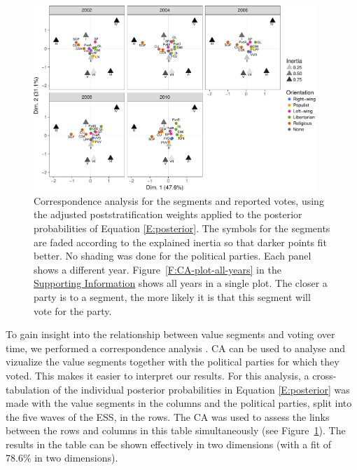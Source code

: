 \documentclass[12pt,letter]{article}\usepackage[]{graphicx}\usepackage[]{xcolor}
\begin{document}
\begin{figure}
\begin{center} 
  \includegraphics[width=0.95\textwidth]{figures/Paper-CA-plots-years-1-edit} 
\end{center}
\caption{Correspondence analysis for the segments and reported votes, using the adjusted poststratification weights applied to the posterior probabilities of Equation \eqref{E:posterior}.  The symbols for the segments are faded according to the explained inertia so that darker points fit better. No shading was done for the political parties. Each panel shows a different year. Figure~\ref{F:CA-plot-all-years} in the \hyperref[S:App]{Supporting Information} shows all years in a single plot. The closer a party is to a segment, the more likely it is that this segment will vote for the party.}\label{F:CA-plot}
\end{figure}

To gain insight into the relationship between value segments and voting over time, we performed a correspondence analysis \citep[CA; e.g.][]{hoffman1986, greenacre2007}. CA can be used to analyse and vizualize the value segments together with the political parties for which they voted. This makes it easier to interpret our results. For this analysis, a cross-tabulation of the individual posterior probabilities in Equation \eqref{E:posterior} was made with the value segments in the columns and the political parties, split into the five waves of the ESS, in the rows. The CA was used to assess the links between the rows and columns in this table simultaneously (see Figure~\ref{F:CA-plot}). The results in the table can be shown effectively in two dimensions (with a fit of 78.6\% in two dimensions).
\end{document}
